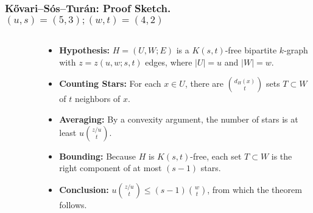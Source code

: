 \documentclass[aspectratio=169]{beamer}
\theoremstyle{mystyle}
\begin{document}
\begin{frame}[fragile]
    \vspace*{-1em}
    \frametitle{Kővari–Sós–Turán: Proof Sketch. $(u, s) = (5, 3); (w, t) = (4, 2)$}

    \begin{columns}[T]

        \begin{column}{.35\textwidth}
            \begin{figure}
                \centering
                \label{fig:kst}
            \end{figure}
        \end{column}

        \begin{column}{.65\textwidth}

            \begin{itemize}

                \item<1-> \textbf{Hypothesis:}
                $H=(U, W; E)$ is a $K(s, t)$-free bipartite $k$-graph with
                $z = z(u, w; s, t)$ edges, where $|U| = u$ and $|W| = w$.

                \item<3-> \textbf{Counting Stars:}
                For each $x \in U$, there are $\binom{d_H(x)}{t}$
                sets $T \subset W$ of $t$ neighbors of $x$.

                \item<9-> \textbf{Averaging:} By a convexity argument,
                the number of stars is at least $u\binom{z/u}{t}$.

                \item<10-> \textbf{Bounding:} Because $H$ is $K(s, t)$-free,
                each set $T \subset W$ is the right component of at most $(s-1)$ stars.

                \item<13-> \textbf{Conclusion:} $u \binom{z/u}{t} \leq (s-1) \binom{w}{t}$,
                from which the theorem follows.
            \end{itemize}
        \end{column}
    \end{columns}

\end{frame}
\end{document}
